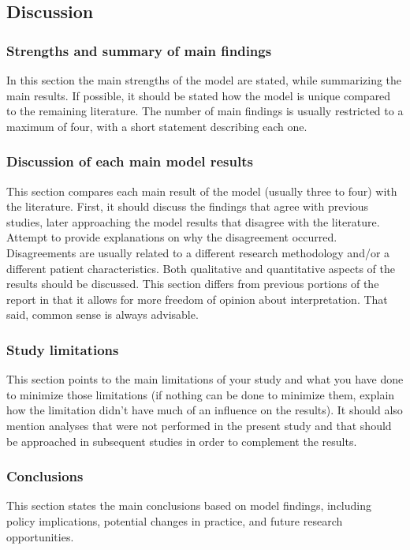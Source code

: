 \documentclass[11pt]{article}
\begin{document}
\subsection {Discussion}

\subsubsection {Strengths and summary of main findings}
In this section the main strengths of the model are stated, while summarizing the main results. If possible, it should be stated how the model is unique compared to the remaining literature. The number of main findings is usually restricted to a maximum of four, with a short statement describing each one.

\subsubsection {Discussion of each main model results} 
This section compares each main result of the model (usually three to four) with the literature. First, it should discuss the findings that agree with previous studies, later approaching the model results that disagree with the literature. Attempt to provide explanations on why the disagreement occurred. Disagreements are usually related to a different research methodology and/or a different patient characteristics.  Both qualitative and quantitative aspects of the results should be discussed. This section differs from previous portions of the report in that it allows for more freedom of opinion about interpretation. That said, common sense is always advisable.

\subsubsection {Study limitations}
This section points to the main limitations of your study and what you have done to minimize those limitations (if nothing can be done to minimize them, explain how the limitation didn't have much of an influence on the results). It should also mention analyses that were not performed in the present study and that should be approached in subsequent studies in order to complement the results.

\subsubsection {Conclusions}
This section states the main conclusions based on model findings, including policy implications, potential changes in practice, and future research opportunities.
\end{document}
